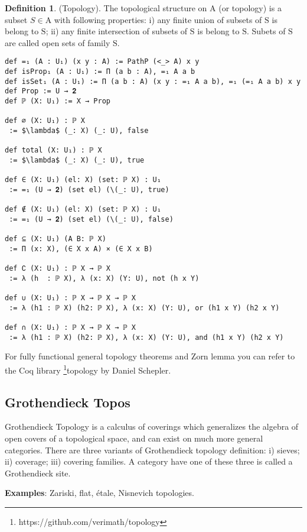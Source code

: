 \documentclass{article}
\theoremstyle{definition}
\newtheorem{definition}{Definition}
\begin{document}
\begin{definition} (Topology). The topological structure on $\mathrm{A}$
(or topology) is a subset $S \in \mathrm{A}$ with following properties:
i) any finite union of subsets of $\mathrm{S}$ is belong to $\mathrm{S}$;
ii) any finite intersection of subsets of $\mathrm{S}$ is belong to $\mathrm{S}$.
Subets of $\mathrm{S}$ are called open sets of family $\mathrm{S}$.
\begin{lstlisting}[mathescape=true]
def =₁ (A : U₁) (x y : A) := PathP (<_> A) x y
def isProp₁ (A : U₁) := Π (a b : A), =₁ A a b
def isSet₁ (A : U₁) := Π (a b : A) (x y : =₁ A a b), =₁ (=₁ A a b) x y
def Prop := U → 𝟐
def ℙ (X: U₁) := X → Prop

def ∅ (X: U₁) : ℙ X
 := $\lambda$ (_: X) (_: U), false

def total (X: U₁) : ℙ X
 := $\lambda$ (_: X) (_: U), true

def ∈ (X: U₁) (el: X) (set: ℙ X) : U₁
 := =₁ (U → 𝟐) (set el) (\(_: U), true)

def ∉ (X: U₁) (el: X) (set: ℙ X) : U₁
 := =₁ (U → 𝟐) (set el) (\(_: U), false)

def ⊆ (X: U₁) (A B: ℙ X)
 := Π (x: X), (∈ X x A) × (∈ X x B)

def ∁ (X: U₁) : ℙ X → ℙ X
 := λ (h  : ℙ X), λ (x: X) (Y: U), not (h x Y)

def ∪ (X: U₁) : ℙ X → ℙ X → ℙ X
 := λ (h1 : ℙ X) (h2: ℙ X), λ (x: X) (Y: U), or (h1 x Y) (h2 x Y)

def ∩ (X: U₁) : ℙ X → ℙ X → ℙ X
 := λ (h1 : ℙ X) (h2: ℙ X), λ (x: X) (Y: U), and (h1 x Y) (h2 x Y)
\end{lstlisting}
For fully functional general topology theorems and Zorn lemma you can refer to
the Coq library \footnote{https://github.com/verimath/topology}{topology} by Daniel Schepler.
\end{definition}

\newpage
\subsection{Grothendieck Topos}

Grothendieck Topology is a calculus of coverings which generalizes the algebra
of open covers of a topological space, and can exist on much more general categories.
There are three variants of Grothendieck topology definition:
i) sieves; ii) coverage; iii) covering families.
A category have one of these three is called a Grothendieck site.

{\bf Examples}: Zariski, flat, étale, Nisnevich topologies.
\end{document}
